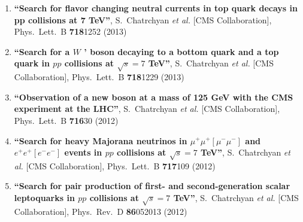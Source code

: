 \begin{enumerate}
\item%
{\bf ``Search for flavor changing neutral currents in top quark decays in pp collisions at 7 TeV''}, 
  S.~Chatrchyan {\it et al.}  [CMS Collaboration], 
Phys.\ Lett.\ B {\bf 718}1252 (2013) %


\item%
{\bf ``Search for a $W$ ' boson decaying to a bottom quark and a top quark in $pp$ collisions at $\sqrt{s}=7$ TeV''}, 
  S.~Chatrchyan {\it et al.}  [CMS Collaboration], 
Phys.\ Lett.\ B {\bf 718}1229 (2013) %


\item%
{\bf ``Observation of a new boson at a mass of 125 GeV with the CMS experiment at the LHC''}, 
  S.~Chatrchyan {\it et al.}  [CMS Collaboration], 
Phys.\ Lett.\ B {\bf 716}30 (2012) %


\item%
{\bf ``Search for heavy Majorana neutrinos in $\mu^+\mu^+[\mu^-\mu^-]$ and $e^+e^+[e^-e^-]$ events in $pp$ collisions at $\sqrt{s} = 7$ TeV''}, 
  S.~Chatrchyan {\it et al.}  [CMS Collaboration], 
Phys.\ Lett.\ B {\bf 717}109 (2012) %


\item%
{\bf ``Search for pair production of first- and second-generation scalar leptoquarks in $pp$ collisions at $\sqrt{s}= 7$ TeV''}, 
  S.~Chatrchyan {\it et al.}  [CMS Collaboration], 
Phys.\ Rev.\ D {\bf 86}052013 (2012) %



\end{enumerate}

